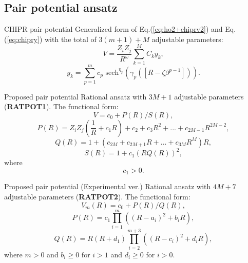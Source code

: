 \documentclass{beamer}
\def\D{\displaystyle}
\begin{document}
\subsection{Pair potential ansatz}
\begin{frame}{CHIPR pair potential}
    Generalized form of Eq.(\ref{eq:ho2+chiprv2}) and Eq.(\ref{eq:chipry}) with the total of $3(m + 1) + M$ adjustable parameters:
    \begin{equation}
        V = \frac{Z_iZ_j}{R^{\omega}}\sum_{k=1}^M C_ky_k,
        \label{eq:chiprv2general}
    \end{equation}
    \begin{equation}
        y_k = \D\sum_{p=1}^m c_{p}\text{ sech}^{\eta_{p}}(\gamma_{p}(\left[R - \zeta\beta^{p-1}\right])).
    \end{equation}
\end{frame}
\begin{frame}{Proposed pair potential}
    Rational ansatz with $3M+1$ adjustable parameters (\textbf{RATPOT1}). The functional form:
    \begin{equation}
        V = c_0 + P(R)/S(R),
        \label{eq:diatomicgeneralm}
    \end{equation}
    \begin{equation}
        P(R) = Z_iZ_j\left(\frac{1}{R}+ c_1 R\right)+c_2+c_3 R^2+ ...+c_{2M-1}R^{2M-2},
        \label{eq:diatomicgeneralm2}
    \end{equation}
    \begin{equation}
        Q(R)=1+(c_{2M}+c_{2M+1} R +...+c_{3M} R^M)R,
        \label{eq:diatomicgeneralm3}
    \end{equation}
    \begin{equation}
        S(R)=1+c_1 (R Q(R))^2,
        \label{eq:diatomicgeneralm4}
    \end{equation}
    where
    \begin{equation}
        c_1 > 0.
        \label{eq:diatomicgeneralm5}
    \end{equation}
\end{frame}
\begin{frame}{Proposed pair potential}
    (Experimental ver.) Rational ansatz with $4M+7$ adjustable parameters (\textbf{RATPOT2}). The functional form:
    \begin{equation}
        V_m(R)=c_0+P(R)/Q(R),
        \label{eq:ratpot2}
    \end{equation}
    \begin{equation}
        P(R)=c_1\prod_{i=1}^m ((R-a_i)^2+b_i R),
    \end{equation}
    \begin{equation}
        Q(R)=R(R+d_1)\prod_{i=2}^{m+3}((R-c_i)^2+d_i R),
    \end{equation}
    where $m>0$ and $b_i \ge 0 \text{ for } i>1$ and $d_i \ge 0 \text{ for } i>0$.
\end{frame}
\end{document}
